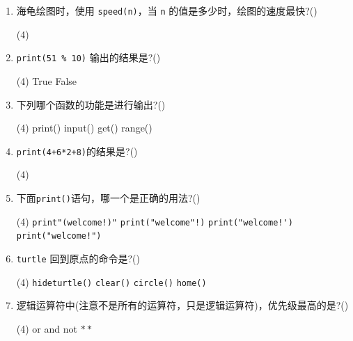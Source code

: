 \documentclass[11pt]{ctexart}
\begin{document}
\begin{enumerate}
        \item  海龟绘图时，使用 \lstinline{speed(n)}，当 \lstinline{n} 的值是多少时，绘图的速度最快?(\qquad)
        \begin{tasks}(4)
        \end{tasks}

        \item \lstinline!print(51 % 10)! 输出的结果是?(\qquad)
        \begin{tasks}(4)
            \task True
            \task False
        \end{tasks}
        
        \item 下列哪个函数的功能是进行输出?(\qquad)
        \begin{tasks}(4)
            \task print()
            \task input()
            \task get()
            \task range()
        \end{tasks}

        \item \lstinline!print(4+6*2+8)!的结果是?(\qquad)
        \begin{tasks}(4)
        \end{tasks}

        \item 下面\lstinline!print()!语句，哪一个是正确的用法?(\qquad)
        \begin{tasks}(4)
            \task \lstinline{print"(welcome!)"}
            \task \lstinline{print("welcome"!)}
            \task \lstinline{print("welcome!')}
            \task \lstinline{print("welcome!")}
        \end{tasks}

        \item \lstinline{turtle} 回到原点的命令是?(\qquad)
        \begin{tasks}(4)
            \task \lstinline{hideturtle()}
            \task \lstinline{clear()}
            \task \lstinline{circle()}
            \task \lstinline{home()}
        \end{tasks}

        \item 逻辑运算符中(注意不是所有的运算符，只是逻辑运算符)，优先级最高的是?(\qquad)
        \begin{tasks}(4)
            \task or
            \task and
            \task not
            \task $**$
        \end{tasks}


\end{enumerate}
\end{document}
